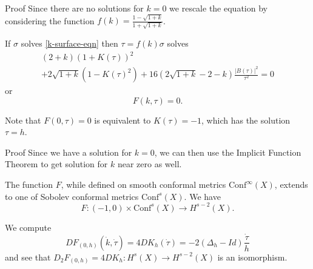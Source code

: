 \documentclass[professionalfont]{beamer}
\begin{document}


\begin{frame}{Proof}
Since there are no solutions for $k = 0$ we rescale the equation by considering the function $f(k) = \frac{1-\sqrt{1+k}}{1+\sqrt{1+k}}$. 
\newline \pause



If $\sigma$ solves \eqref{k-surface-eqn} then $\tau = f(k)\sigma$ solves 
\begin{multline*}
(2+k)(1+K(\tau))^2  \\ + 2\sqrt{1+k}\left(1-K(\tau)^2 \right) +16\left(2\sqrt{1+k} - 2 - k  \right)\frac{|B(\tau)|^2}{\tau^2} = 0
\end{multline*}or 
\[
F(k,\tau) = 0.
\]\pause


Note that $F(0,\tau) = 0$ is equivalent to $K(\tau) = -1$, which has the solution $\tau = h$. 
\end{frame}




\begin{frame}{Proof}
Since we have a solution for $k = 0$, we can then use the Implicit Function Theorem to get solution for $k$ near zero as well. 
\newline

The function $F$, while defined on smooth conformal metrics $\mathrm{Conf}^\infty(X)$, extends to one of Sobolev conformal metrics $\mathrm{Conf}^s(X)$. We have 
\[
F: (-1,0) \times \mathrm{Conf}^s(X) \to H^{s-2}(X).
\] \pause

We compute
\[
DF_{(0,h)}(\dot{k},\dot{\tau}) = 4D K_h(\dot{\tau}) =-2(\Delta_h - Id)\frac{\dot{\tau}}{h}
\]
and see that $D_2F_{(0,h)} = 4D K_h: H^s(X) \to H^{s-2}(X)$ is an isomorphism.
\newline

\end{frame}


\end{document}
